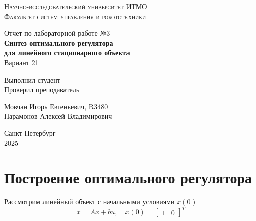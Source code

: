 \documentclass[a4paper,hidelinks,14pt]{extarticle}
\begin{document}
	\begin{titlepage}
		\setlength{\parindent}{0ex}
		
		\begin{center}
			\textsc{
				\vspace{1ex}
                Научно-исследовательский университет ИТМО \\
				\vspace{0.5ex}
				Факультет систем управления и робототехники \\
				\vspace{0.5ex}
			}
		\end{center}
		
		\vspace{45mm}
		
		\begin{center}
			Отчет по лабораторной работе №3\\
			\textbf{Синтез оптимального регулятора \\
			для линейного стационарного объекта} \\
			Вариант 21
		\end{center}
		
		\vspace{50mm}
		
		\begin{minipage}{.45\linewidth}
			Выполнил студент
            \\
			Проверил преподаватель
		\end{minipage}
		\hfill
		\begin{minipage}{.52\linewidth}
			\begin{flushright}
				Мовчан Игорь Евгеньевич, R3480
                \\
				Парамонов Алексей Владимирович
			\end{flushright}
		\end{minipage}
		
		\vfill
		\begin{center}
			Санкт-Петербург
			\\
			2025
		\end{center}
		
	\end{titlepage}

	\tableofcontents
	\clearpage
	
	\section{Построение оптимального регулятора}
	Рассмотрим линейный объект с начальными условиями $x(0)$
	\[
		\dot{x} = Ax + bu, \quad x(0) = \begin{bmatrix}
			1 & 0
		\end{bmatrix}^T
	\]
\end{document}
